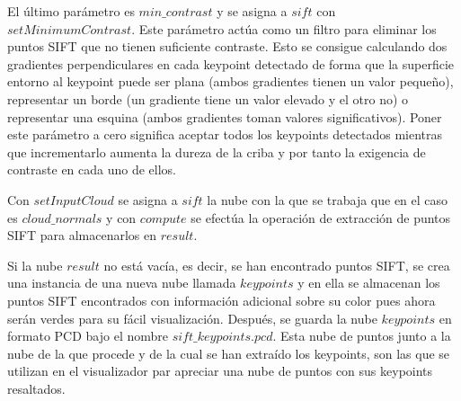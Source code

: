 
El último parámetro es $min\_contrast$ y se asigna a $sift$ con $setMinimumContrast$. Este parámetro actúa como un filtro para eliminar los puntos SIFT que no tienen suficiente contraste. Esto se consigue calculando dos gradientes perpendiculares en cada keypoint detectado de forma que la superficie entorno al keypoint puede ser plana (ambos gradientes tienen un valor pequeño), representar un borde (un gradiente tiene un valor elevado y el otro no) o representar una esquina (ambos gradientes toman valores significativos). Poner este parámetro a cero significa aceptar todos los keypoints detectados mientras que incrementarlo aumenta la dureza de la criba y por tanto la exigencia de contraste en cada uno de ellos.

Con $setInputCloud$ se asigna a $sift$ la nube con la que se trabaja que en el caso es $cloud\_normals$ y con $compute$ se efectúa la operación de extracción de puntos SIFT para almacenarlos en $result$.



Si la nube $result$ no está vacía, es decir, se han encontrado puntos SIFT, se crea una instancia de una nueva nube llamada $keypoints$ y en ella se almacenan los puntos SIFT encontrados con información adicional sobre su color pues ahora serán verdes para su fácil visualización. Después, se guarda la nube $keypoints$ en formato PCD bajo el nombre $sift\_keypoints.pcd$. Esta nube de puntos junto a la nube de la que procede y de la cual se han extraído los keypoints, son las que se utilizan en el visualizador par apreciar una nube de puntos con sus keypoints resaltados.

\iffalse
\begin{lstlisting}[language=C++,breaklines]
  if(result->points.size()>0){
  
  	std::cout << "Number of SIFT points in " << filename << ": " << result->points.size () << std::endl;

	sift_points = result->points.size();

	pcl::PointCloud<pcl::PointXYZRGBA>::Ptr keypoints(new pcl::PointCloud<pcl::PointXYZRGBA>);
  
	keypoints->width = result->width;
	keypoints->height = result->height;
	keypoints->points.resize(keypoints->width * keypoints->height);

   	for (size_t i = 0; i < result->points.size (); ++i)
  	{
    	keypoints->points[i].x = result->points[i].x;
    	keypoints->points[i].y = result->points[i].y;
    	keypoints->points[i].z = result->points[i].z;

  		keypoints->points[i].r=50;
  		keypoints->points[i].g=255;
  		keypoints->points[i].b=50;
  		keypoints->points[i].a=255;
  	}
  	pcl::io::savePCDFileASCII ("sift_keypoints.pcd", *keypoints);
  }
  else {
  	std::cout << "No sift points found" << std::endl;
	sift_points = 0;
  }
\end{lstlisting}
\fi

